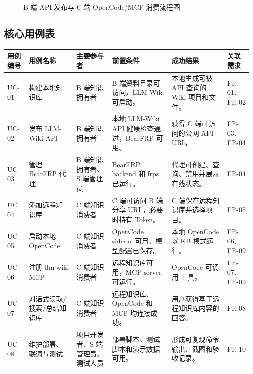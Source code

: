 \documentclass[UTF8,a4paper,12pt,fontset=fandol]{ctexart}
\newcommand{\code}[1]{\texorpdfstring{\begingroup\footnotesize\detokenize{#1}\endgroup}{#1}}
\begin{document}
\begin{figure}[H]
{}
\caption{B 端 API 发布与 C 端 OpenCode/MCP 消费流程图}
\label{fig:workflow}
\end{figure}

\subsection{核心用例表}
\begin{longtable}{>{\centering\arraybackslash}p{1.5cm}p{2.5cm}p{2.6cm}p{3.0cm}p{3.2cm}p{1.5cm}}
\toprule
用例编号 & 用例名称 & 主要参与者 & 前置条件 & 成功结果 & 关联需求 \\
\midrule
UC-01 & 构建本地知识库 & B 端知识拥有者 & B 端资料目录可访问，LLM-Wiki 可启动。 & 本地生成可被 API 查询的 Wiki 项目和文件。 & FR-01、FR-02 \\
UC-02 & 发布 LLM-Wiki API & B 端知识拥有者 & 本地 LLM-Wiki API 健康检查通过，BearFRP 可用。 & 获得 C 端可访问的公网 API URL。 & FR-03、FR-04 \\
UC-03 & 管理 BearFRP 代理 & B 端知识拥有者、S 端管理员 & BearFRP backend 和 frps 已运行。 & 代理可创建、查询、禁用并展示在线状态。 & FR-04 \\
UC-04 & 添加远程知识库 & C 端知识消费者 & C 端可访问 B 端分享 URL，必要时持有 Token。 & C 端保存远程知识库并选择项目。 & FR-05 \\
UC-05 & 启动本地 OpenCode & C 端知识消费者 & OpenCode sidecar 可用，模型配置已保存。 & 本地 OpenCode 以 KB 模式运行。 & FR-06、FR-09 \\
UC-06 & 注册 llm-wiki MCP & C 端知识消费者 & 远程知识库可用，MCP server 可运行。 & OpenCode 可调用 \code{llm_wiki_*} 工具。 & FR-07、FR-09 \\
UC-07 & 对话式读取/搜索/总结知识库 & C 端知识消费者 & 远程知识库、OpenCode 和 MCP 均连接成功。 & 用户获得基于远程知识库内容的回答。 & FR-08 \\
UC-08 & 维护部署、联调与测试 & 项目开发者、S 端管理员、测试人员 & 部署脚本、测试脚本和演示数据可用。 & 形成可复现命令输出、截图和验收记录。 & FR-10 \\
\bottomrule
\end{longtable}
\end{document}
